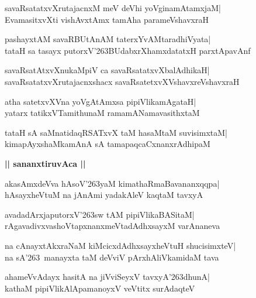 \documentclass[twoside,12pt,openright]{book}
\def\S{\char'263}
\newcounter{shloka}[chapter]
\def\uvaca#1{\centerline{{\large\textbf{#1}}}}
\begin{document}
\begin{shloka}%
savaRsatatxvXrutajacnxM meV deVhi yoVginamAtamxjaM|\\
EvamasitxvXti vishAvxtAmx tamAha parameVshavxraH
\end{shloka}

\begin{shloka}%
pashayxtAM savaRBUtAnAM taterxYvAMtaradhiVyata|\\
tataH sa tasayx putorxV\S BUdabxrXhamxdatatxH parxtApavAnf
\end{shloka}

\begin{shloka}%
savaRsatAtxvXnukaMpiV ca savaRsatatxvXbalAdhikaH|\\
savaRsatatxvXrutajacnxshacx savaRsatetxvXVshavxreVshavxraH
\end{shloka}

\begin{shloka}%
atha satetxvXVna yoVgAtAmxsa pipiVlikamAgataH|\\
yatarx tatikxVTamithunaM ramamANamavasithxtaM
\end{shloka}

\begin{shloka}%
tataH sA saMnatidaqRSATxvX taM hasaMtaM suvisimxtaM|\\
kimapAyxshaMkamAnA sA tamapaqcaCxnanxrAdhipaM
\end{shloka}

\uvaca{|| sananxtiruvAca ||}
\begin{shloka}%
akasAmxdeVva hAsoV\S yaM kimathaRmaBavananxqqpa|\\
hAsayxheVtuM na jAnAmi yadakAleV kaqtaM tavxyA
\end{shloka}

\begin{shloka}%
avadadArxjaputorxV\S sw tAM pipiVlikaBASitaM|\\
rAgavadivxvashoVtapxnanxmeVtadAdhxsayxM varAnaneva
\end{shloka}

\begin{shloka}%
na cAnayxtAkxraNaM kiMcicxdAdhxsayxheVtuH shucisimxteV|\\
na sA\S \ manayxta taM deVviV pArxhAliVkamidaM tava
\end{shloka}

\begin{shloka}%
ahameVvAdayx hasitA na jiVviSeyxV tavxyA\S dhunA|\\
kathaM pipiVlikAlApamanoyxV veVtitx surAdaqteV
\end{shloka}
\end{document}
